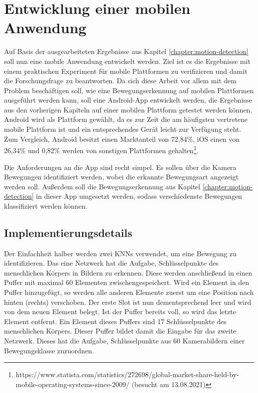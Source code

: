 \chapter{Entwicklung einer mobilen Anwendung}\label{mobile-app}
Auf Basis der ausgearbeiteten Ergebnisse aus Kapitel
\ref{chapter:motion-detection} soll nun eine mobile Anwendung entwickelt
werden. Ziel ist es die Ergebnisse mit einem praktischen Experiment für mobile
Plattformen zu verifizieren und damit die Forschungsfrage zu beantworten. Da
sich diese Arbeit vor allem mit dem Problem beschäftigen soll, wie eine
Bewegungserkennung auf mobilen Plattformen ausgeführt werden kann, soll eine
Android-App entwickelt werden, die Ergebnisse aus den vorherigen Kapiteln auf
einer mobilen Plattform getestet werden können. Android wird als Plattform
gewählt, da es zur Zeit die am häufigsten vertretene mobile Plattform ist und
ein entsprechendes Gerät leicht zur Verfügung steht. Zum Vergleich, Android
besitzt einen Marktanteil von 72,84\%, iOS einen von 26,34\% und 0,82\% werden
von sonstigen Plattformen
gehalten\footnote{https://www.statista.com/statistics/272698/global-market-share-held-by-mobile-operating-systems-since-2009/
  (besucht am 13.08.2021)}.

Die Anforderungen an die App sind recht simpel. Es sollen über die Kamera
Bewegungen identifiziert werden, wobei die erkannte Bewegungsart angezeigt
werden soll. Außerdem soll die Bewegungserkennung aus Kapitel \ref{chapter:motion-detection} in dieser App umgesetzt werden, sodass verschiedenste Bewegungen klassifiziert werden können.

\section{Implementierungsdetails}
Der Einfachheit halber werden zwei KNNs verwendet, um eine Bewegung zu
identifizieren. Das eine Netzwerk hat die Aufgabe, Schlüsselpunkte des
menschlichen Körpers in Bildern zu erkennen. Diese werden anschließend in einen
Puffer mit maximal 60 Elementen zwischengespeichert. Wird ein Element in den
Puffer hinzugefügt, so werden alle anderen Elemente zuerst um eine Position nach
hinten (rechts) verschoben. Der erste Slot ist nun dementsprechend leer und wird
von dem neuen Element belegt. Ist der Puffer bereits voll, so wird das letzte
Element entfernt. Ein Element dieses Puffers sind 17 Schlüsselpunkte des
menschlichen Körpers. Dieser Puffer bildet damit die Eingabe für das zweite
Netzwerk.  Dieses hat die Aufgabe, Schlüsselpunkte aus 60 Kamerabildern einer
Bewegungsklasse zuzuordnen.

